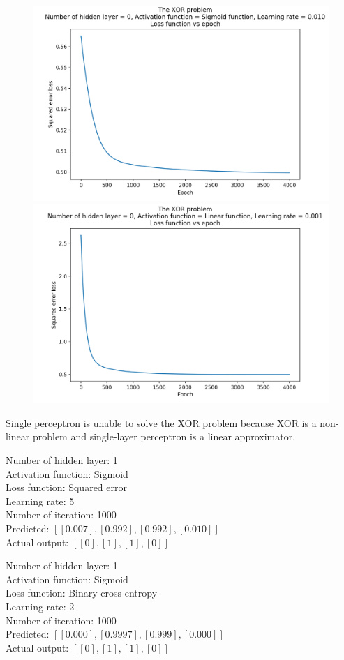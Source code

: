 \documentclass[12pt]{amsart}
\begin{document}
\begin{figure}[h]
\includegraphics[width=0.49\columnwidth]{xor_sigmoid_mse_perceptron.png}
\includegraphics[width=0.49\columnwidth]{xor_linear_mse_perceptron.png}
\end{figure}

Single perceptron is unable to solve the XOR problem because XOR is a non-linear problem and single-layer perceptron is a linear approximator. \\

\pagebreak
\begin{multicols}{2}
Number of hidden layer: 1 \\
Activation function: Sigmoid \\
Loss function: Squared error\\
Learning rate: 5 \\
Number of iteration: 1000 \\
Predicted: $[[0.007], [0.992], [0.992], [0.010]]$ \\
Actual output: $[[0],[1],[1],[0]]$

Number of hidden layer: 1 \\
Activation function: Sigmoid \\
Loss function: Binary cross entropy\\
Learning rate: 2 \\
Number of iteration: 1000 \\
Predicted: $ [[0.000], [0.9997], [0.999], [0.000]]$ \\
Actual output: $[[0],[1],[1],[0]]$
\end{multicols}
\end{document}
